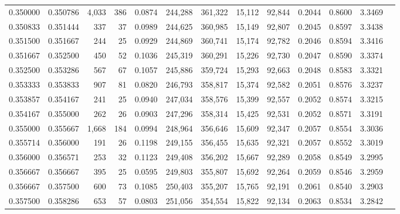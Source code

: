 \begin{tabular}{rrrrrrrrrrrrr}
0.350000 & 0.350786 & 4,033 & 386 &                                     0.0874 & 244,288 & 361,322 &  15,112 &  92,844 & 0.2044 & 0.8600 & 3.3469 \\
0.350833 & 0.351444 &   337 &  37 &                                     0.0989 & 244,625 & 360,985 &  15,149 &  92,807 & 0.2045 & 0.8597 & 3.3438 \\
0.351500 & 0.351667 &   244 &  25 &                                     0.0929 & 244,869 & 360,741 &  15,174 &  92,782 & 0.2046 & 0.8594 & 3.3416 \\
0.351667 & 0.352500 &   450 &  52 &                                     0.1036 & 245,319 & 360,291 &  15,226 &  92,730 & 0.2047 & 0.8590 & 3.3374 \\
0.352500 & 0.353286 &   567 &  67 &                                     0.1057 & 245,886 & 359,724 &  15,293 &  92,663 & 0.2048 & 0.8583 & 3.3321 \\
0.353333 & 0.353833 &   907 &  81 &                                     0.0820 & 246,793 & 358,817 &  15,374 &  92,582 & 0.2051 & 0.8576 & 3.3237 \\
0.353857 & 0.354167 &   241 &  25 &                                     0.0940 & 247,034 & 358,576 &  15,399 &  92,557 & 0.2052 & 0.8574 & 3.3215 \\
0.354167 & 0.355000 &   262 &  26 &                                     0.0903 & 247,296 & 358,314 &  15,425 &  92,531 & 0.2052 & 0.8571 & 3.3191 \\
0.355000 & 0.355667 & 1,668 & 184 &                                     0.0994 & 248,964 & 356,646 &  15,609 &  92,347 & 0.2057 & 0.8554 & 3.3036 \\
0.355714 & 0.356000 &   191 &  26 &                                     0.1198 & 249,155 & 356,455 &  15,635 &  92,321 & 0.2057 & 0.8552 & 3.3019 \\
0.356000 & 0.356571 &   253 &  32 &                                     0.1123 & 249,408 & 356,202 &  15,667 &  92,289 & 0.2058 & 0.8549 & 3.2995 \\
0.356667 & 0.356667 &   395 &  25 &                                     0.0595 & 249,803 & 355,807 &  15,692 &  92,264 & 0.2059 & 0.8546 & 3.2959 \\
0.356667 & 0.357500 &   600 &  73 &                                     0.1085 & 250,403 & 355,207 &  15,765 &  92,191 & 0.2061 & 0.8540 & 3.2903 \\
0.357500 & 0.358286 &   653 &  57 &                                     0.0803 & 251,056 & 354,554 &  15,822 &  92,134 & 0.2063 & 0.8534 & 3.2842 \\

\end{tabular}
